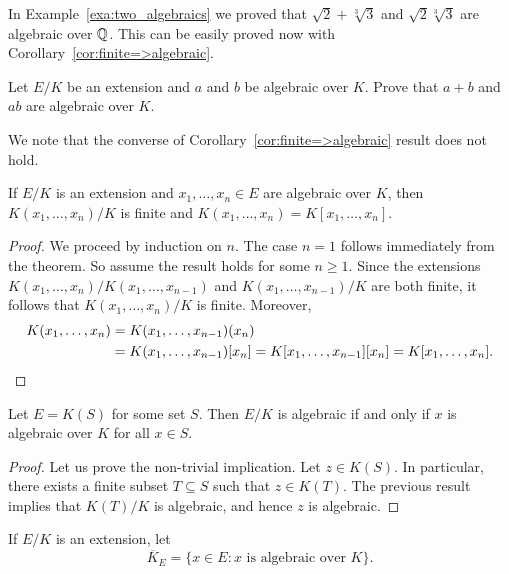 In Example~\ref{exa:two_algebraics} we 
proved that $\sqrt{2}+\sqrt[3]{3}$ and $\sqrt{2}\sqrt[3]{3}$ 
are algebraic over $\mathbb{Q}$. This can be easily proved
now with Corollary~\ref{cor:finite=>algebraic}. 

\begin{exercise}
\label{xca:algebraic}
    Let $E/K$ be an extension and 
    $a$ and $b$ be algebraic over $K$. Prove 
    that $a+b$ and $ab$ are algebraic over $K$. 
\end{exercise}

We note that the converse of Corollary~\ref{cor:finite=>algebraic} result does not hold. 

\begin{corollary}
\label{cor:finite type finite}
	If $E/K$ is an extension and $x_1,\dots,x_n\in E$ 
	are algebraic over $K$, then 
	$K(x_1,\dots,x_n)/K$ is finite and
	$K(x_1,\dots,x_n)=K[x_1,\dots,x_n]$. 
\end{corollary}

\begin{proof}
	We proceed by induction on $n$. The case $n=1$ follows immediately from 
	the theorem. So assume the result holds for some $n\geq1$. Since the extensions 
	$K(x_1,\dots,x_n)/K(x_1,\dots,x_{n-1})$ and $K(x_1,\dots,x_{n-1})/K$ are
	both finite, it follows that $K(x_1,\dots,x_n)/K$ is finite. Moreover, 
	\begin{align*}
	K(x_1,\dots,x_n)&=K(x_1,\dots,x_{n-1})(x_n)\\
	&=K(x_1,\dots,x_{n-1})[x_n]=K[x_1,\dots,x_{n-1}][x_n]=K[x_1,\dots,x_n].\qedhere
    \end{align*}
\end{proof}

\begin{corollary}
\label{cor:finite type algebraic}
	Let $E=K(S)$ for some set $S$. Then $E/K$ is algebraic if and only if
	$x$ is algebraic over $K$ for all $x\in S$. 
\end{corollary}

\begin{proof}
	Let us prove the non-trivial implication. Let $z\in K(S)$. In particular, 
	there exists a finite subset $T\subseteq S$ such that 
	$z\in K(T)$. The previous result implies that $K(T)/K$ is algebraic, and
	hence $z$ is algebraic. 
\end{proof}

If $E/K$ is an extension, let 
\[
	\overline{K}_E=\{x\in E:x\text{ is algebraic over }K\}. 
\]

